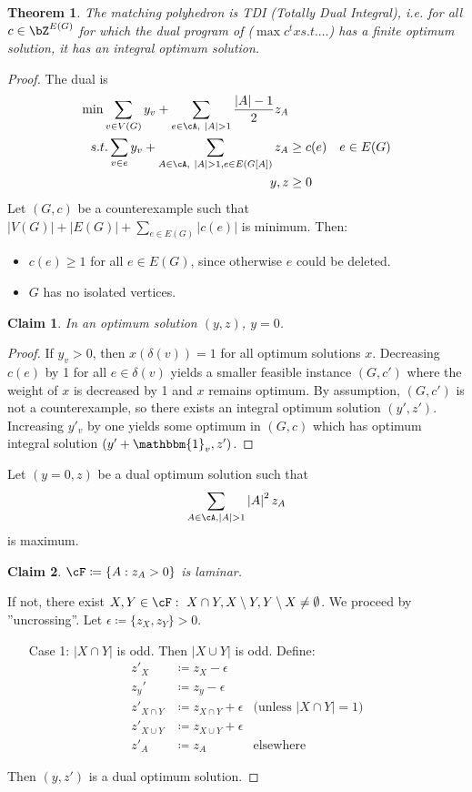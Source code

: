 \documentclass[11pt, a4paper]{article}
\newcommand{\abs}[1]{\left\lvert#1\right\rvert}
\newcommand{\set}[1]{\{#1\}}
\newtheorem{theorem}{Theorem}[section]
\newtheorem*{claim}{Claim}
\theoremstyle{remark}
\theoremstyle{definition}
\begin{document}
\begin{theorem}
	The matching polyhedron is TDI (Totally Dual Integral), i.e. for all
	$c\in \bZ^{E(G)}$ for which the dual program of ($\max c^tx s.t.\ldots$)
	has a finite optimum solution, it has an integral optimum solution.
\end{theorem}
\begin{proof}
The dual is
\begin{align*}
	\min \sum_{v\in V(G)}y_v+\sum_{e\in\cA,\ \abs{A}>1}\frac{\abs{A}-1}{2}z_A \\
	s.t.\sum_{v\in e}y_v
		+\sum_{A\in\cA,\ \abs{A}>1,e\in E(G[A])}z_A&\geq c(e) &e\in E(G) \\
	y,z&\geq0
\end{align*}
Let $(G,c)$ be a counterexample such that  $\abs{V(G)}+\abs{E(G)}+
\sum_{e\in E(G)}\abs{c(e)}$ is minimum. Then:
\begin{itemize}
	\item $c(e)\geq 1$ for all
	$e\in E(G)$, since otherwise $e$ could be deleted. 
	\item $G$ has no isolated vertices.
\end{itemize}
\begin{claim}
In an optimum solution $(y,z)$, $y=0$.
\end{claim}
\begin{proof}
If $y_v>0$, then $x(\delta(v))=1$ for all optimum solutions $x$. Decreasing
$c(e)$ by 1 for all $e\in\delta(v)$ yields a smaller feasible instance
$(G,c')$ where the weight of $x$ is decreased by 1 and $x$ remains optimum.
By assumption, $(G,c')$ is not a counterexample, so there exists an integral
optimum solution $(y',z')$. Increasing $y'_v$ by one yields some optimum
in $(G,c)$ which has optimum integral solution $(y'+\mathbbm{1}_v,z')$.
\end{proof}

Let $(y=0,z)$ be a dual optimum solution such that 
\[\sum_{A\in\cA, \abs{A}>1} \abs{A}^2z_A\]
is maximum.
\begin{claim}
$\cF\coloneqq\set{A: z_A>0}$ is laminar.
\end{claim}
If not, there exist $X,Y\in\cF:\ X\cap Y,X\setminus Y,Y\setminus X\neq\emptyset$.
We proceed by ''uncrossing''. Let $\epsilon\coloneqq \set{z_X,z_Y}>0$.
\begin{enumerate}
	\item[Case 1:] $\abs{X\cap Y}$ is odd. Then $\abs{X\cup Y}$ is odd.
	Define:
	\begin{align*}
	z'_X&\coloneqq z_X-\epsilon \\
	z_y'&\coloneqq z_y-\epsilon \\
	z'_{X\cap Y}&\coloneqq z_{X\cap Y}+\epsilon &\text{(unless $\abs{X\cap Y}=1$)} \\
	z'_{X\cup Y}&\coloneqq z_{X\cup Y}+\epsilon \\
	z'_A&\coloneqq z_A &\text{elsewhere}
	\end{align*}
\end{enumerate}
Then $(y,z')$ is a dual optimum solution.

\end{proof}
\end{document}
